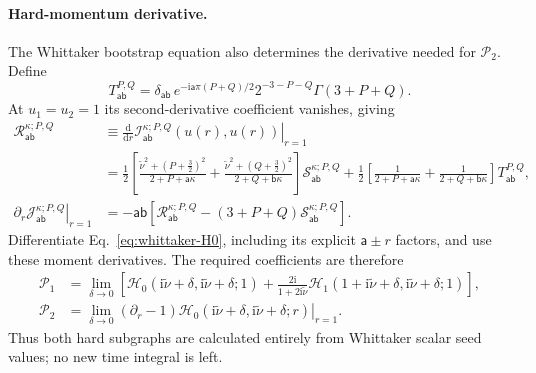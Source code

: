 \documentclass[a4paper,12pt]{article}
\newcommand{\ii}{\mathrm i}
\newcommand{\tn}{\tilde\nu}
\def\aa{\mathsf a}
\newcommand{\bb}{\mathsf b}
\newcommand{\di}{\mathrm d}
\begin{document}
\paragraph{Hard-momentum derivative.}
The Whittaker bootstrap equation also determines the derivative
needed for $\mathcal P_2$. Define
\[
 T_{\aa\bb}^{P,Q}=\delta_{\aa\bb}\,
 e^{-\ii \aa\pi(P+Q)/2}2^{-3-P-Q}\Gamma(3+P+Q).
\]
At $u_1=u_2=1$ its second-derivative coefficient vanishes, giving
\begin{align}
 \mathscr R_{\aa\bb}^{\kappa;P,Q}
 &\equiv\left.\frac{\di}{\di r}
 \mathscr I_{\aa\bb}^{\kappa;P,Q}(u(r),u(r))\right|_{r=1}\nonumber\\
 &=\frac12\left[
 \frac{\tn^2+(P+\tfrac32)^2}{2+P+\aa\kappa}
 +\frac{\tn^2+(Q+\tfrac32)^2}{2+Q+\bb\kappa}\right]
 \mathscr S_{\aa\bb}^{\kappa;P,Q}
 +\frac12\left[\frac1{2+P+\aa\kappa}
             +\frac1{2+Q+\bb\kappa}\right]T_{\aa\bb}^{P,Q},
 \label{eq:seed-bootstrap-derivative}\\
 \left.\partial_r\mathcal J_{\aa\bb}^{\kappa;P,Q}\right|_{r=1}
 &=-\aa\bb\left[\mathscr R_{\aa\bb}^{\kappa;P,Q}
 -(3+P+Q)\mathscr S_{\aa\bb}^{\kappa;P,Q}\right].
 \label{eq:whittaker-moment-derivative}
\end{align}
Differentiate Eq.~\eqref{eq:whittaker-H0}, including its explicit
$\aa\pm r$ factors, and use these moment derivatives.
The required coefficients are therefore
\begin{align}
 \mathcal P_1&=\lim_{\delta\to0}
 \left[\mathcal H_0(\ii\tn+\delta,\ii\tn+\delta;1)
 +\frac{2\ii}{1+2\ii\tn}
 \mathcal H_1(1+\ii\tn+\delta,\ii\tn+\delta;1)\right],\nonumber\\
 \mathcal P_2&=\lim_{\delta\to0}
 \left.(\partial_r-1)
 \mathcal H_0(\ii\tn+\delta,\ii\tn+\delta;r)\right|_{r=1}.
 \label{eq:whittaker-hard-coefficients}
\end{align}
Thus both hard subgraphs are calculated entirely from Whittaker
scalar seed values; no new time integral is left.
\end{document}
